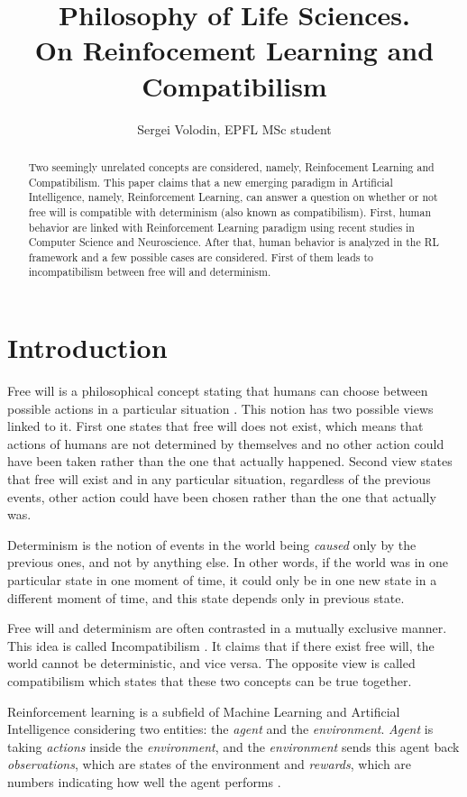 \documentclass[a4paper]{article}
\title{Philosophy of Life Sciences.\\ On Reinfocement Learning and Compatibilism}
\author{Sergei Volodin, EPFL MSc student}
\date{}
\begin{document}
\maketitle

\begin{abstract}
Two seemingly unrelated concepts are considered, namely, Reinfocement Learning and Compatibilism. This paper claims that a new emerging paradigm in Artificial Intelligence, namely, Reinforcement Learning, can answer a question on whether or not free will is compatible with determinism (also known as compatibilism).
First, human behavior are linked with Reinforcement Learning paradigm using recent studies in Computer Science and Neuroscience.
After that, human behavior is analyzed in the RL framework and a few possible cases are considered. First of them leads to incompatibilism between free will and determinism.
\end{abstract}

\section{Introduction}
Free will is a philosophical concept stating that humans can choose between possible actions in a particular situation \cite{freewillst}. This notion has two possible views linked to it. First one states that free will does not exist, which means that actions of humans are not determined by themselves and no other action could have been taken rather than the one that actually happened. Second view states that free will exist and in any particular situation, regardless of the previous events, other action could have been chosen rather than the one that actually was.

Determinism \cite{determinismst} is the notion of events in the world being {\em caused} only by the previous ones, and not by anything else. In other words, if the world was in one particular state in one moment of time, it could only be in one new state in a different moment of time, and this state depends only in previous state.

Free will and determinism are often contrasted in a mutually exclusive manner. This idea is called Incompatibilism \cite{compatibilismst}. It claims that if there exist free will, the world cannot be deterministic, and vice versa. The opposite view is called compatibilism which states that these two concepts can be true together.

Reinforcement learning is a subfield of Machine Learning and Artificial Intelligence considering two entities: the {\em agent} and the {\em environment}. {\em Agent} is taking {\em actions} inside the {\em environment}, and the {\em environment} sends this agent back {\em observations}, which are states of the environment and {\em rewards}, which are numbers indicating how well the agent performs \cite{sutton}.
\end{document}
